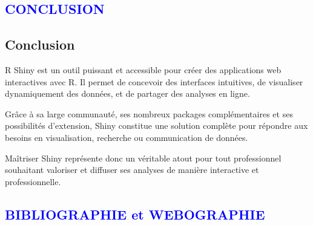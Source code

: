 \documentclass[
]{article}
\begin{document}
\newpage

\textcolor{blue}{\section*{CONCLUSION}}

\subsection{Conclusion}\label{conclusion}

R Shiny est un outil puissant et accessible pour créer des applications
web interactives avec R. Il permet de concevoir des interfaces
intuitives, de visualiser dynamiquement des données, et de partager des
analyses en ligne.

Grâce à sa large communauté, ses nombreux packages complémentaires et
ses possibilités d'extension, Shiny constitue une solution complète pour
répondre aux besoins en visualisation, recherche ou communication de
données.

Maîtriser Shiny représente donc un véritable atout pour tout
professionnel souhaitant valoriser et diffuser ses analyses de manière
interactive et professionnelle. \newpage

\textcolor{blue}{\section*{BIBLIOGRAPHIE et WEBOGRAPHIE}}
\end{document}
